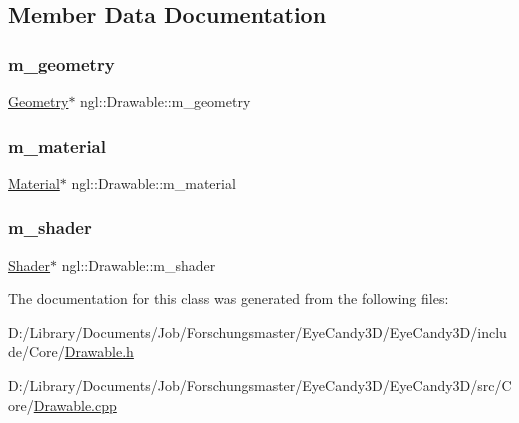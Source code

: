 \subsection{Member Data Documentation}
\mbox{\label{classngl_1_1_drawable_a2c1079df525baf277b99726965d9e2c3}} 
\subsubsection{\texorpdfstring{m\+\_\+geometry}{m\_geometry}}
{\footnotesize\ttfamily \mbox{\hyperlink{classngl_1_1_geometry}{Geometry}}$\ast$ ngl\+::\+Drawable\+::m\+\_\+geometry\hspace{0.3cm}{\ttfamily [protected]}}

\mbox{\label{classngl_1_1_drawable_aeb87e960367869c0e911a6f9f9054fda}} 
\subsubsection{\texorpdfstring{m\+\_\+material}{m\_material}}
{\footnotesize\ttfamily \mbox{\hyperlink{classngl_1_1_material}{Material}}$\ast$ ngl\+::\+Drawable\+::m\+\_\+material\hspace{0.3cm}{\ttfamily [protected]}}

\mbox{\label{classngl_1_1_drawable_acf18737209928e853671afdec880558c}} 
\subsubsection{\texorpdfstring{m\+\_\+shader}{m\_shader}}
{\footnotesize\ttfamily \mbox{\hyperlink{classngl_1_1_shader}{Shader}}$\ast$ ngl\+::\+Drawable\+::m\+\_\+shader\hspace{0.3cm}{\ttfamily [protected]}}



The documentation for this class was generated from the following files\+:\begin{DoxyCompactItemize}
\item 
D\+:/\+Library/\+Documents/\+Job/\+Forschungsmaster/\+Eye\+Candy3\+D/\+Eye\+Candy3\+D/include/\+Core/\mbox{\hyperlink{_drawable_8h}{Drawable.\+h}}\item 
D\+:/\+Library/\+Documents/\+Job/\+Forschungsmaster/\+Eye\+Candy3\+D/\+Eye\+Candy3\+D/src/\+Core/\mbox{\hyperlink{_drawable_8cpp}{Drawable.\+cpp}}\end{DoxyCompactItemize}
